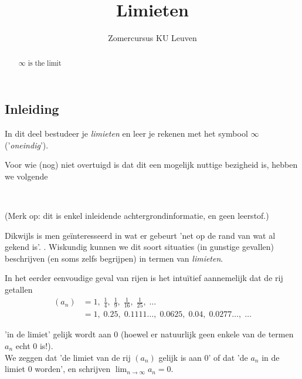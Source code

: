 \documentclass[numbers]{ximera}
\author{Zomercursus KU Leuven}
\title{Limieten}
\begin{document}
\begin{abstract}
	$\infty$ is the limit
\end{abstract}
\maketitle

\subsection{Inleiding}
In dit deel bestudeer je \textit{limieten} en leer je rekenen met het symbool $\infty$ ('\textit{oneindig}').

\begin{expandable}
Voor wie (nog) niet overtuigd is dat dit een mogelijk nuttige bezigheid is, hebben we volgende%


\begin{uitwijding} \ 
	
(Merk op: dit is enkel inleidende achtergrondinformatie, en geen leerstof.)	

Dikwijls is men geïnteresseerd in wat er gebeurt 'net op de rand van wat al gekend is'. . Wiskundig kunnen we dit soort situaties (in gunstige gevallen) beschrijven (en soms zelfs begrijpen) in termen van \textit{limieten}. 

In het eerder eenvoudige geval van rijen is het intuïtief aannemelijk dat de rij getallen
\begin{align*}
(a_n) & = 1, \;\frac{1}{4}, \;\frac{1}{9}, \;\frac{1}{16},\;\frac{1}{25},\;\dots\\
                                & =1,\; 0.25,\;  0.1111\dots,\; 0.0625,\; 0.04,\; 0.0277\dots,\; \dots
\end{align*}

'in de limiet' gelijk wordt aan $0$ (hoewel er natuurlijk geen enkele van de termen $a_n$ echt $0$ is!). \\
We zeggen dat 'de limiet van de rij $(a_n)$ gelijk is aan $0$' of dat 'de $a_n$ in de limiet $0$ worden', en schrijven $\lim_{n\to\infty}a_n = 0$.


\end{uitwijding}
\end{expandable}
\end{document}
